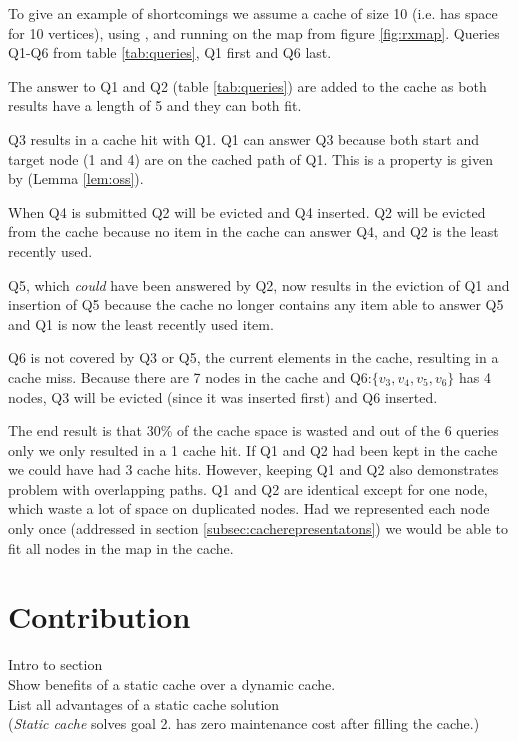 To give an example of \lrus shortcomings we assume a cache of size 10 (i.e. has space for 10 vertices), using \lruns, and running on the map from figure \ref{fig:rxmap}. Queries Q1-Q6 from table \ref{tab:queries}, Q1 first and Q6 last.

The answer to Q1 and Q2 (table \ref{tab:queries}) are added to the cache as both results have a length of 5 and they can both fit. 

Q3 results in a cache hit with Q1. Q1 can answer Q3 because both start and target node (1 and 4) are on the cached path of Q1. This is a property is given by \oss (Lemma \ref{lem:oss}).

When Q4 is submitted Q2 will be evicted and Q4 inserted. Q2 will be evicted from the cache because no item in the cache can answer Q4, and Q2 is the least recently used.

Q5, which \textit{could} have been answered by Q2, now results in the eviction of Q1 and insertion of Q5 because the cache no longer contains any item able to answer Q5 and Q1 is now the least recently used item.

Q6 is not covered by Q3 or Q5, the current elements in the cache, resulting in a cache miss. Because there are 7 nodes in the cache and Q6:$\{v_3,v_4,v_5,v_6\}$ has 4 nodes, Q3 will be evicted (since it was inserted first) and Q6 inserted. 

The end result is that 30\% of the cache space is wasted and out of the 6 queries only we only resulted in a 1 cache hit. If Q1 and Q2 had been kept in the cache we could have had 3 cache hits. However, keeping Q1 and Q2 also  demonstrates \lrus problem with overlapping paths. Q1 and Q2 are identical except for one node, which waste a lot of space on duplicated nodes. Had we represented each node only once (addressed in section \ref{subsec:cacherepresentatons}) we would be able to fit all nodes in the map in the cache.







\section{Contribution} \label{sec:contribution}

Intro to section \\
Show benefits of a static cache over a dynamic cache.\\
List all advantages of a static cache solution \\
(\textit{Static cache} solves goal 2. has zero maintenance cost after filling the cache.)


